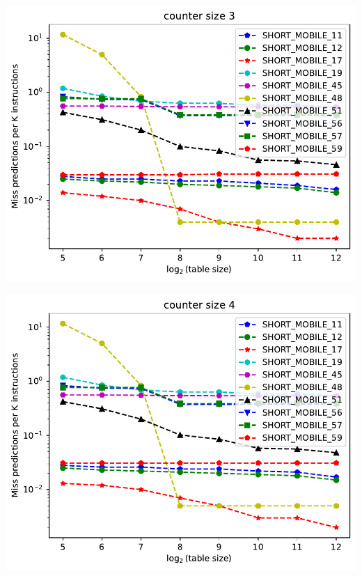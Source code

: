 \documentclass[a4paper]{article}
\begin{document}
\begin{minipage}{.48\linewidth}
\includegraphics[width=\linewidth]{pht/graph_3}
\end{minipage}%
\hfill
\begin{minipage}{.48\linewidth}
\includegraphics[width=\linewidth]{pht/graph_4}
\end{minipage}
\end{document}
